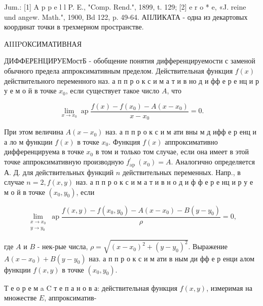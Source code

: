 \documentclass[10pt]{article}
\begin{document}
Jum.: [1] A p p e l l P. E., "Comp. Rend.", 1899, t. 129; [2] e r o * e, «J. reine und angew. Math.", 1900, Bd 122, p. 49-64. АIIЛИКАТА - одна из декартовых координат точки в трехмерном пространстве.



АIIIPОКСИМАТИВНАЯ



ДИФФЕРЕНЦИРУЕМостБ - обобщение понятия дифференцируемости с заменой обычного предела аппроксимативным пределом. Действительная функция $f(x)$ действительного переменного наз. а п п р о к с и м а т и в но д и фф е р е нц и р у е м о й в точке $x_{0}$, если существует такое число $A$, что



\[

\lim _{x \rightarrow x_{0}} \operatorname{ap} \frac{f(x)-f\left(x_{0}\right)-A\left(x-x_{0}\right)}{x-x_{0}}=0 .

\]



При этом величина $A\left(x-x_{0}\right)$ наз. а п п р о к с и м ати вны м д ифф е р енц и а ло м функции $f(x)$ в точке $x_{0}$. Функция $f(x)$ аппроксимативно дифференцируема в точке $x_{0}$ в том и только том случае, если она имеет в этой точке аппроксимативную производную $f_{\text {ap }}^{\prime}\left(x_{0}\right)=A$. Аналогично определяется А. Д. для действительных функций $n$ действительных переменных. Напр., в случае $n=2, f(x, y)$ наз. а п п р о к с и м а т и в н о д и ф ф е р е нц и р у е м о й в точке $\left(x_{0}, y_{0}\right)$, если



\[

\lim _{\substack{x \rightarrow x_{0} \\ y \rightarrow y_{0}}} \operatorname{ap} \frac{f(x, y)-f\left(x_{0}, y_{0}\right)-A\left(x-x_{0}\right)-B\left(y-y_{0}\right)}{\rho}=0,

\]



где $A$ и $B$ - нек-рые числа, $\rho=\sqrt{\left(x-x_{0}\right)^{2}+\left(y-y_{0}\right)^{2}}$. Выражение $A\left(x-x_{0}\right)+B\left(y-y_{0}\right)$ наз. а п п р о к с и м ати в ным ди фф е р енци алом функции $f(x, y)$ в точке $\left(x_{0}, y_{0}\right)$.



Т е о р е м a C т е п а н о в а: действительная функция $f(x, y)$, измеримая на множестве $E$, аппроксиматив-
\end{document}
